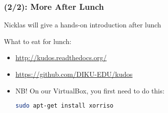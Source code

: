\begin{frame}[fragile]

\frametitle{\kudos{} (2/2): More \kudos{} After Lunch}

\vspace{\fill}

\begin{center}

Nicklas will give a hands-on introduction after lunch

\end{center}

\vspace{\fill}

What to eat for lunch:

\begin{itemize}

\item \url{http://kudos.readthedocs.org/}

\item \url{https://github.com/DIKU-EDU/kudos}

\item NB! On our VirtualBox, you first need to do this:

\begin{lstlisting}[language=bash]
sudo apt-get install xorriso
\end{lstlisting}

\end{itemize}

\vspace{\fill}

\end{frame}
